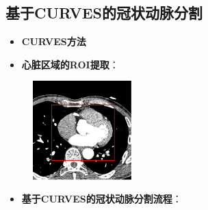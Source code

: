 \subsection[冠状动脉分割I]{基于CURVES的冠状动脉分割}

\begin{frame}
\begin{itemize}
\item \textbf{CURVES方法}
\end{itemize}
\end{frame}

\begin{frame}
\begin{itemize}
  \item \textbf{心脏区域的ROI提取}：
\end{itemize}
\begin{figure}[t]
\centering
\includegraphics[width=1.5in]{../../Figures/coronary/ROI_Extraction}
\end{figure}
\end{frame}

\begin{frame}
\begin{itemize}
  \item \textbf{基于CURVES的冠状动脉分割流程}：
\end{itemize}
\begin{figure}[t]
\centering

\end{figure}
\end{frame}

